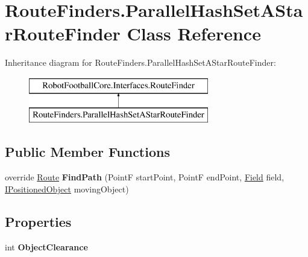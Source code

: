 \hypertarget{class_route_finders_1_1_parallel_hash_set_a_star_route_finder}{\section{Route\-Finders.\-Parallel\-Hash\-Set\-A\-Star\-Route\-Finder Class Reference}
\label{class_route_finders_1_1_parallel_hash_set_a_star_route_finder}
}
Inheritance diagram for Route\-Finders.\-Parallel\-Hash\-Set\-A\-Star\-Route\-Finder\-:\begin{figure}[H]
\begin{center}
\leavevmode
\includegraphics[height=2.000000cm]{class_route_finders_1_1_parallel_hash_set_a_star_route_finder}
\end{center}
\end{figure}
\subsection*{Public Member Functions}
\begin{DoxyCompactItemize}
\item 
\hypertarget{class_route_finders_1_1_parallel_hash_set_a_star_route_finder_a3c81a6aab2626baa10bff7431f2e77dd}{override \hyperlink{class_robot_football_core_1_1_route_objects_1_1_route}{Route} {\bfseries Find\-Path} (Point\-F start\-Point, Point\-F end\-Point, \hyperlink{class_robot_football_core_1_1_objects_1_1_field}{Field} field, \hyperlink{interface_robot_football_core_1_1_interfaces_1_1_i_positioned_object}{I\-Positioned\-Object} moving\-Object)}\label{class_route_finders_1_1_parallel_hash_set_a_star_route_finder_a3c81a6aab2626baa10bff7431f2e77dd}

\end{DoxyCompactItemize}
\subsection*{Properties}
\begin{DoxyCompactItemize}
\item 
\hypertarget{class_route_finders_1_1_parallel_hash_set_a_star_route_finder_ae57088da36c8aa887369dfe92c51b18f}{int {\bfseries Object\-Clearance}}\label{class_route_finders_1_1_parallel_hash_set_a_star_route_finder_ae57088da36c8aa887369dfe92c51b18f}

\end{DoxyCompactItemize}
